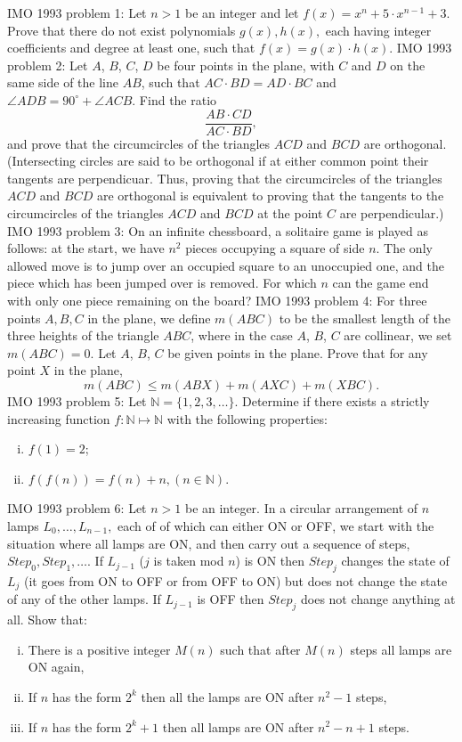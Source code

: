 IMO 1993 problem 1:  Let $n > 1$ be an integer and let $f(x) = x^n + 5 \cdot x^{n-1} + 3.$ Prove that there do not exist polynomials $g(x),h(x),$ each having integer coefficients and degree at least one, such that $f(x) = g(x) \cdot h(x).$ 
IMO 1993 problem 2:  Let $A$, $B$, $C$, $D$ be four points in the plane, with $C$ and $D$ on the same side of the line $AB$, such that $AC \cdot BD = AD \cdot BC$ and $\angle ADB = 90^{\circ}+\angle ACB$. Find the ratio
\[ \frac{AB \cdot CD}{AC \cdot BD}, \]
and prove that the circumcircles of the triangles $ACD$ and $BCD$ are orthogonal. (Intersecting circles are said to be orthogonal if at either common point their tangents are perpendicuar. Thus, proving that the circumcircles of the triangles $ACD$ and $BCD$ are orthogonal is equivalent to proving that the tangents to the circumcircles of the triangles $ACD$ and $BCD$ at the point $C$ are perpendicular.) 
IMO 1993 problem 3:  On an infinite chessboard, a solitaire game is played as follows: at the start, we have $n^2$ pieces occupying a square of side $n.$ The only allowed move is to jump over an occupied square to an unoccupied one, and the piece which has been jumped over is removed. For which $n$ can the game end with only one piece remaining on the board? 
IMO 1993 problem 4:  For three points $A,B,C$ in the plane, we define $m(ABC)$ to be the smallest length of the three heights of the triangle $ABC$, where in the case $A$, $B$, $C$ are collinear, we set $m(ABC) = 0$. Let $A$, $B$, $C$ be given points in the plane. Prove that for any point $X$ in the plane,
\[ m(ABC) \leq m(ABX) + m(AXC) + m(XBC). \] 
IMO 1993 problem 5:  Let $\mathbb{N} = \{1,2,3, \ldots\}$. Determine if there exists a strictly increasing function $f: \mathbb{N} \mapsto \mathbb{N}$ with the following properties:
\begin{enumerate}[(i)]
  \item $f(1) = 2$;
  \item $f(f(n)) = f(n) + n, (n \in \mathbb{N})$.
\end{enumerate} 
IMO 1993 problem 6:  Let $n > 1$ be an integer. In a circular arrangement of $n$ lamps $L_0, \ldots, L_{n-1},$ each of of which can either ON or OFF, we start with the situation where all lamps are ON, and then carry out a sequence of steps, $Step_0, Step_1, \ldots .$  If $L_{j-1}$ ($j$ is taken mod $n$) is ON then $Step_j$ changes the state of $L_j$ (it goes from ON to OFF or from OFF to ON) but does not change the state of any of the other lamps. If $L_{j-1}$ is OFF then $Step_j$ does not change anything at all. Show that:
\begin{enumerate}[(i)]
  \item There is a positive integer $M(n)$ such that after $M(n)$ steps all lamps are ON again,
  \item If $n$ has the form $2^k$ then all the lamps are ON after $n^2-1$ steps,
  \item If $n$ has the form $2^k + 1$ then all lamps are ON after $n^2 - n + 1$ steps.
\end{enumerate} 

